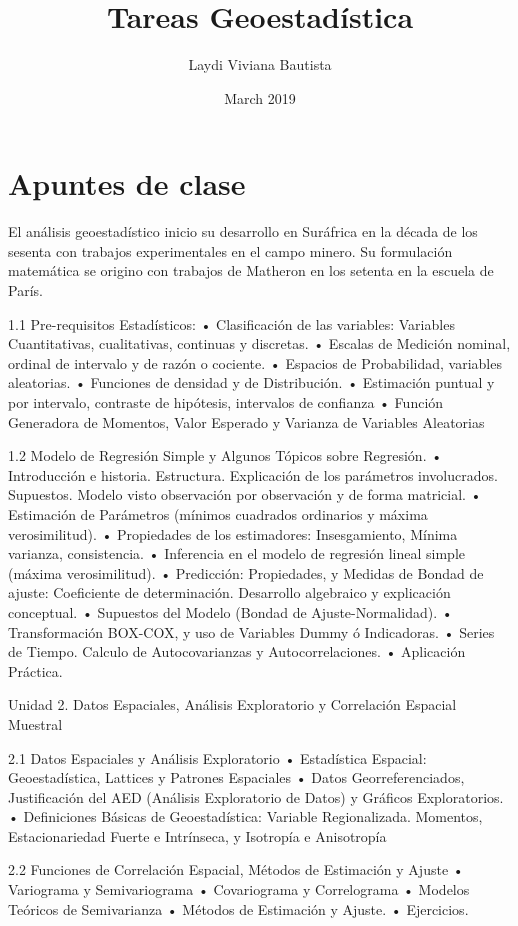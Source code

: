 \documentclass{book}
\title{Tareas Geoestadística}
\author{Laydi Viviana Bautista}
\date{March 2019}
\begin{document}
\chapter{Apuntes de clase}

El análisis geoestadístico inicio su desarrollo en Suráfrica en la década de los sesenta con trabajos experimentales en el campo minero. Su formulación matemática se origino con trabajos de Matheron en los setenta en la escuela de París.


1.1 Pre-requisitos Estadísticos:
    • Clasificación de las variables: Variables Cuantitativas, cualitativas, continuas y discretas.
    • Escalas de Medición nominal, ordinal de intervalo y de razón o cociente.
    • Espacios de Probabilidad, variables aleatorias.
    • Funciones de densidad y de Distribución.
    • Estimación puntual y por intervalo, contraste de hipótesis, intervalos de confianza
    • Función Generadora de Momentos, Valor Esperado y Varianza de Variables Aleatorias
    

1.2 Modelo de Regresión Simple y Algunos Tópicos sobre Regresión. 
    • Introducción e historia. Estructura. Explicación de los parámetros involucrados. Supuestos. Modelo visto observación por observación y de forma matricial.
    • Estimación de Parámetros (mínimos cuadrados ordinarios y máxima verosimilitud).
    • Propiedades de los estimadores: Insesgamiento, Mínima varianza, consistencia.
    • Inferencia en el modelo de regresión lineal simple (máxima verosimilitud).
    • Predicción: Propiedades, y Medidas de Bondad de ajuste: Coeficiente de determinación. Desarrollo algebraico y explicación conceptual. 
    • Supuestos del Modelo (Bondad de Ajuste-Normalidad).
    • Transformación BOX-COX, y uso de Variables Dummy ó Indicadoras.
    • Series de Tiempo. Calculo de Autocovarianzas y Autocorrelaciones. 
    • Aplicación Práctica.

Unidad 2. Datos Espaciales, Análisis Exploratorio y Correlación Espacial Muestral

2.1 Datos Espaciales y Análisis Exploratorio
    • Estadística Espacial: Geoestadística, Lattices y Patrones Espaciales
    • Datos Georreferenciados, Justificación del AED (Análisis Exploratorio de Datos) y Gráficos Exploratorios.
    • Definiciones Básicas de Geoestadística: Variable Regionalizada. Momentos, Estacionariedad Fuerte e Intrínseca, y Isotropía e Anisotropía

2.2 Funciones de Correlación Espacial, Métodos de Estimación y Ajuste
    • Variograma y Semivariograma
    • Covariograma y Correlograma
    • Modelos Teóricos de Semivarianza
    • Métodos de Estimación y Ajuste.
    • Ejercicios.
\end{document}
